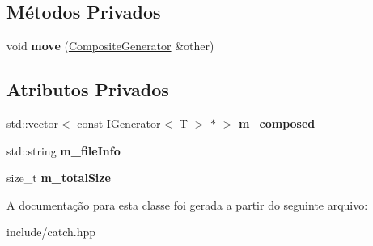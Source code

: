 \subsection*{Métodos Privados}
\begin{DoxyCompactItemize}
\item 
void {\bfseries move} (\hyperlink{classCatch_1_1CompositeGenerator}{Composite\+Generator} \&other)\hypertarget{classCatch_1_1CompositeGenerator_afbc02d3f638a121a8ccd67f0c4498deb}{}\label{classCatch_1_1CompositeGenerator_afbc02d3f638a121a8ccd67f0c4498deb}

\end{DoxyCompactItemize}
\subsection*{Atributos Privados}
\begin{DoxyCompactItemize}
\item 
std\+::vector$<$ const \hyperlink{structCatch_1_1IGenerator}{I\+Generator}$<$ T $>$ $\ast$ $>$ {\bfseries m\+\_\+composed}\hypertarget{classCatch_1_1CompositeGenerator_a9491042c1e0fa20dd2ad652c4b6d1dfd}{}\label{classCatch_1_1CompositeGenerator_a9491042c1e0fa20dd2ad652c4b6d1dfd}

\item 
std\+::string {\bfseries m\+\_\+file\+Info}\hypertarget{classCatch_1_1CompositeGenerator_aaaeb076065d0a9c8e30dfbe05ca493b6}{}\label{classCatch_1_1CompositeGenerator_aaaeb076065d0a9c8e30dfbe05ca493b6}

\item 
size\+\_\+t {\bfseries m\+\_\+total\+Size}\hypertarget{classCatch_1_1CompositeGenerator_a73234ad81da793e83bb17b829523ef66}{}\label{classCatch_1_1CompositeGenerator_a73234ad81da793e83bb17b829523ef66}

\end{DoxyCompactItemize}


A documentação para esta classe foi gerada a partir do seguinte arquivo\+:\begin{DoxyCompactItemize}
\item 
include/catch.\+hpp\end{DoxyCompactItemize}

